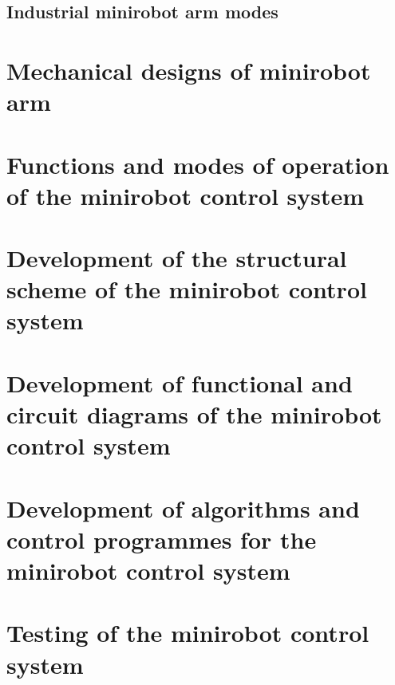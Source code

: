 \subsection{Industrial minirobot arm modes}


\section{Mechanical designs of minirobot arm}

\section{Functions and modes of operation of the minirobot control system }

\section{Development of the structural scheme of the minirobot control system}

\section{Development of functional and circuit diagrams of the minirobot control system}


\section{Development of algorithms and control programmes for the minirobot control system}


\section{Testing of the minirobot control system }

% 
